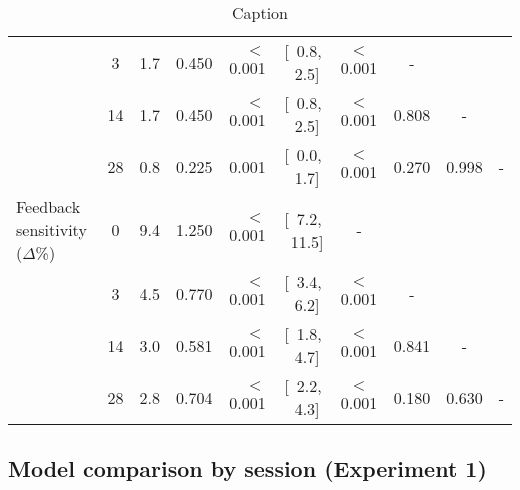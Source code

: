 \documentclass[a4paper,12pt]{article}
\begin{document}
\begin{refsection}[supp]
\begin{table}[h!]
\begin{adjustbox}{center}
\begin{tabular}{lcrrrccccc}
                                &  3   & 1.7 & 0.450 &  $<$0.001 & [\ 0.8, \ 2.5] & $<$0.001 & -     &       &   \\
                                & 14 & 1.7 & 0.450 &  $<$0.001 & [\ 0.8, \ 2.5] & $<$0.001 & 0.808 & -     &   \\
                                & 28 & 0.8 & 0.225 & 0.001 & [\ 0.0, \ 1.7] & $<$0.001 & 0.270 & 0.998 & - \\
        \midrule
        \footnotesize Feedback  sensitivity ($\Delta$\%) &  0 & 9.4 & 1.250 & $<$0.001 & [\ 7.2, \ 11.5] &        - &       &       &   \\
         &  3 & 4.5 & 0.770 & $<$0.001 & [\ 3.4, \ 6.2] & $<$0.001 & -     &       &   \\
                                          & 14 & 3.0 & 0.581 & $<$0.001 & [\ 1.8, \ 4.7] & $<$0.001 & 0.841 & -     &   \\
                                          & 28 & 2.8 & 0.704 & $<$0.001 & [\ 2.2, \ 4.3] & $<$0.001 & 0.180 & 0.630 & - \\
        \bottomrule
    \end{tabular}
    \end{adjustbox}
    \caption{Caption}
    \label{tab:stats_exp01}
\end{table}

\clearpage
\subsection*{Model comparison by session (Experiment 1)}


\end{refsection}
\end{document}
